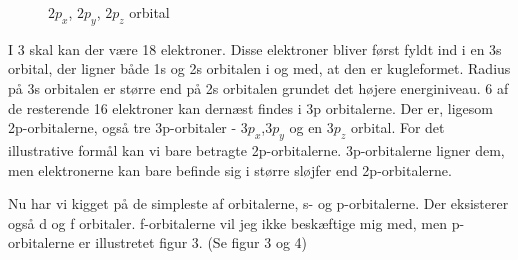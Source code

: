 \begin{figure}[ht!]
  \centering
  \caption{$2p_x$, $2p_y$, $2p_z$ orbital} \end{figure}

I 3 skal kan der være 18 elektroner. Disse elektroner bliver først fyldt ind i en 3s orbital, der ligner både 1s og 2s orbitalen i og med, at den er kugleformet. Radius på 3s orbitalen er større end på 2s orbitalen grundet det højere energiniveau. 6 af de resterende 16 elektroner kan dernæst findes i 3p orbitalerne. Der er, ligesom 2p-orbitalerne, også tre 3p-orbitaler - $3p_x$,$3p_y$ og en $3p_z$ orbital. For det illustrative formål kan vi bare betragte 2p-orbitalerne. 3p-orbitalerne ligner dem, men elektronerne kan bare befinde sig i større sløjfer end 2p-orbitalerne. 

Nu har vi kigget på de simpleste af orbitalerne, s- og p-orbitalerne. Der eksisterer også d og f orbitaler. f-orbitalerne vil jeg ikke beskæftige mig med, men p-orbitalerne er illustretet  figur 3. (Se figur 3 og 4) 
\\

